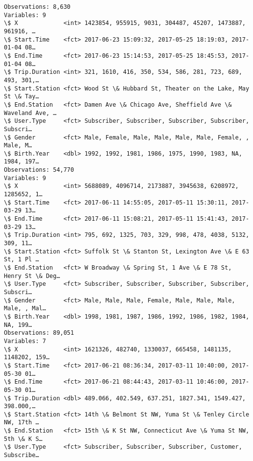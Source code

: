 \documentclass[11pt]{article}
\begin{document}
    \begin{Verbatim}[commandchars=\\\{\}]
Observations: 8,630
Variables: 9
\$ X             <int> 1423854, 955915, 9031, 304487, 45207, 1473887, 961916, …
\$ Start.Time    <fct> 2017-06-23 15:09:32, 2017-05-25 18:19:03, 2017-01-04 08…
\$ End.Time      <fct> 2017-06-23 15:14:53, 2017-05-25 18:45:53, 2017-01-04 08…
\$ Trip.Duration <int> 321, 1610, 416, 350, 534, 586, 281, 723, 689, 493, 301,…
\$ Start.Station <fct> Wood St \& Hubbard St, Theater on the Lake, May St \& Tay…
\$ End.Station   <fct> Damen Ave \& Chicago Ave, Sheffield Ave \& Waveland Ave, …
\$ User.Type     <fct> Subscriber, Subscriber, Subscriber, Subscriber, Subscri…
\$ Gender        <fct> Male, Female, Male, Male, Male, Male, Female, , Male, M…
\$ Birth.Year    <dbl> 1992, 1992, 1981, 1986, 1975, 1990, 1983, NA, 1984, 197…
Observations: 54,770
Variables: 9
\$ X             <int> 5688089, 4096714, 2173887, 3945638, 6208972, 1285652, 1…
\$ Start.Time    <fct> 2017-06-11 14:55:05, 2017-05-11 15:30:11, 2017-03-29 13…
\$ End.Time      <fct> 2017-06-11 15:08:21, 2017-05-11 15:41:43, 2017-03-29 13…
\$ Trip.Duration <int> 795, 692, 1325, 703, 329, 998, 478, 4038, 5132, 309, 11…
\$ Start.Station <fct> Suffolk St \& Stanton St, Lexington Ave \& E 63 St, 1 Pl …
\$ End.Station   <fct> W Broadway \& Spring St, 1 Ave \& E 78 St, Henry St \& Deg…
\$ User.Type     <fct> Subscriber, Subscriber, Subscriber, Subscriber, Subscri…
\$ Gender        <fct> Male, Male, Male, Female, Male, Male, Male, Male, , Mal…
\$ Birth.Year    <dbl> 1998, 1981, 1987, 1986, 1992, 1986, 1982, 1984, NA, 199…
Observations: 89,051
Variables: 7
\$ X             <int> 1621326, 482740, 1330037, 665458, 1481135, 1148202, 159…
\$ Start.Time    <fct> 2017-06-21 08:36:34, 2017-03-11 10:40:00, 2017-05-30 01…
\$ End.Time      <fct> 2017-06-21 08:44:43, 2017-03-11 10:46:00, 2017-05-30 01…
\$ Trip.Duration <dbl> 489.066, 402.549, 637.251, 1827.341, 1549.427, 398.000,…
\$ Start.Station <fct> 14th \& Belmont St NW, Yuma St \& Tenley Circle NW, 17th …
\$ End.Station   <fct> 15th \& K St NW, Connecticut Ave \& Yuma St NW, 5th \& K S…
\$ User.Type     <fct> Subscriber, Subscriber, Subscriber, Customer, Subscribe…

    \end{Verbatim}
\end{document}
